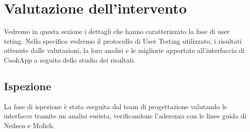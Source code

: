 \section{Valutazione dell'intervento}
Vedremo in questa sezione i dettagli che hanno caratterizzato la fase di user teting. 
Nello specifico vedremo il protocollo di User Testing utilizzato, i
risultati ottenute dalle valutazioni, la loro analisi e le migliorie
apportate all'interfaccia di CookApp a seguito dello studio dei
risultati.

\subsection{Ispezione}
La fase di ispezione è stata eseguita dal team di progettazione
valutando le interfacce tramite un analisi eurista, verificandone
l'aderenza con le linee guida di Neilsen e Molich.

